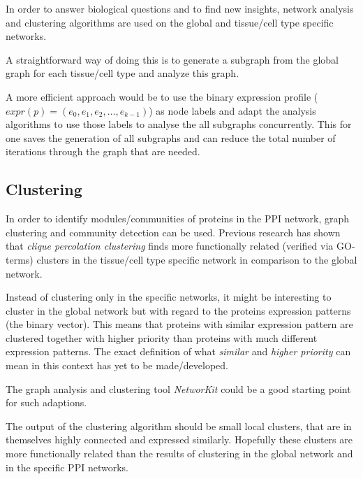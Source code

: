 \documentclass{article}
\begin{document}
In order to answer biological questions and to find new insights,
network analysis and clustering algorithms are used on the global
and tissue/cell type specific networks.

A straightforward way of doing this is to generate a subgraph from the global
graph for each tissue/cell type and analyze this graph.

A more efficient approach would be to use the binary expression profile
($expr(p) = (e_0, e_1, e_2, \ldots, e_{k-1})$) as node labels and adapt
the analysis algorithms to use those labels to analyse the all subgraphs
concurrently. This for one saves the generation of all subgraphs and can
reduce the total number of iterations through the graph that are needed.

\subsection{Clustering}

In order to identify modules/communities of proteins in the PPI network,
graph clustering and community detection can be used. Previous research
\cite{ChanWang:functional_modules}
has shown that \emph{clique percolation clustering} finds more functionally
related (verified via GO-terms) clusters in the tissue/cell type specific
network in comparison to the global network.

Instead of clustering only in the specific networks, it might be interesting
to cluster in the global network but with regard to the proteins expression
patterns (the binary vector). This means that proteins with similar expression
pattern are clustered together with higher priority than proteins with
much different expression patterns. The exact definition of what \emph{similar}
and \emph{higher priority} can mean in this context has yet to be made/developed.

The graph analysis and clustering tool \emph{NetworKit} could be a
good starting point for such adaptions.

The output of the clustering algorithm should be small local clusters, that
are in themselves highly connected and expressed similarly. Hopefully these
clusters are more functionally related than the results of clustering
in the global network and in the specific PPI networks.


%
%



\end{document}
